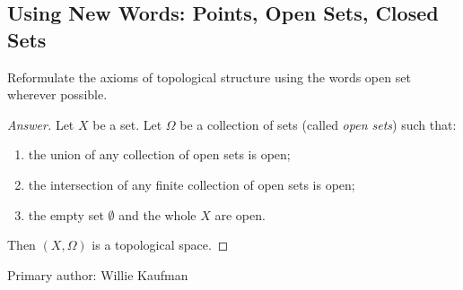 \subsection{Using New Words: Points, Open Sets, Closed Sets}
\begin{majorEx} %
  Reformulate the axioms of topological structure using the words open
  set wherever possible.
\end{majorEx}

\begin{proof}[Answer]
    Let $X$ be a set. Let $\Omega$ be a collection of sets (called
    \emph{open sets}) such that:
    \begin{enumerate}
        \item the union of any collection of open sets is open;
        \item the intersection of any finite collection of open sets is open;
        \item the empty set $\emptyset$ and the whole $X$ are open.
    \end{enumerate}
    Then $(X, \Omega)$ is a topological space.
\end{proof}

Primary author: Willie Kaufman
